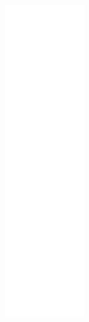 \begin{figure}[H]
\begin{center}
\leavevmode
\includegraphics[height=400pt]{classConnectedStateHandler__coll__graph}
\end{center}
\end{figure}
